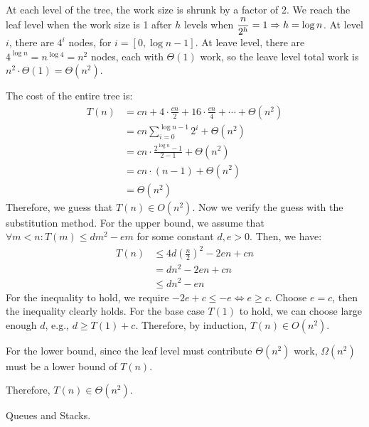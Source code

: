 \documentclass[answers]{exam}
\begin{document}
\begin{questions}
\begin{parts}
\begin{solution}
            At each level of the tree, the work size is shrunk by a factor of 2.
            We reach the leaf level when the work size is 1 after $h$ levels when $\displaystyle\frac{n}{2^h}=1 \Rightarrow h=\log n$.
            At level $i$, there are $4^i$ nodes, for $i=[0, \log n -1]$.
            At leave level, there are $4^{\log n}=n^{\log 4}=n^2$ nodes, each with $\Theta(1)$ work, so the leave level total work is $n^2\cdot\Theta(1)=\Theta(n^2)$.

            The cost of the entire tree is:
            \begin{align*}
                T(n)&=cn+4\cdot\frac{cn}{2}+16\cdot\frac{cn}{4}+\cdots+\Theta(n^2)\\
                &=cn\sum_{i=0}^{\log n-1} 2^i + \Theta(n^2)\\
                &=cn\cdot\frac{2^{\log n}-1}{2-1} + \Theta(n^2)\\
                &=cn\cdot (n-1) + \Theta(n^2)\\
                &=\Theta(n^2)
            \end{align*}
            Therefore, we guess that $T(n)\in O(n^2)$.
            Now we verify the guess with the substitution method.
            For the upper bound, we assume that $\forall m<n : T(m)\leq dm^2-em$ for some constant $d,e>0$.
            Then, we have:
            \begin{align*}
                T(n)&\leq 4d\left(\frac{n}{2}\right)^2 - 2en + cn\\
                &=dn^2 - 2en + cn\\
                &\leq dn^2 - en
            \end{align*}
            For the inequality to hold, we require $-2e+c\leq -e \Leftrightarrow e\geq c$.
            Choose $e=c$, then the inequality clearly holds.
            For the base case $T(1)$ to hold, we can choose large enough $d$, e.g., $d\geq T(1)+c$.
            Therefore, by induction, $T(n)\in O(n^2)$.

            For the lower bound, since the leaf level must contribute $\Theta(n^2)$ work, $\Omega(n^2)$ must be a lower bound of $T(n)$.

            Therefore, $T(n)\in\Theta(n^2)$.
        \end{solution}

    \end{parts}

    \question Queues and Stacks.
    \begin{parts}
        

\end{parts}
\end{questions}
\end{document}
